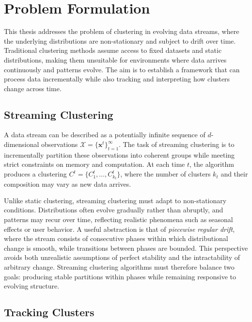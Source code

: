 \section{Problem Formulation}\label{ch:problem_formulation}

This thesis addresses the problem of clustering in evolving data streams, where
the underlying distributions are non-stationary and subject to drift over time.
Traditional clustering methods assume access to fixed datasets and static
distributions, making them unsuitable for environments where data arrives
continuously and patterns evolve. The aim is to establish a framework that can
process data incrementally while also tracking and interpreting how clusters
change across time.

\subsection{Streaming Clustering}\label{sec:prob_streaming_clustering}

A data stream can be described as a potentially infinite sequence of
$d$-dimensional observations
$\mathcal{X}=\{\mathbf{x}^t\}_{t=1}^{\infty}$. The task of streaming clustering
is to incrementally partition these observations into coherent groups while
meeting strict constraints on memory and computation. At each time $t$, the
algorithm produces a clustering $C^t=\{C_1^t,\dots,C_{k_t}^t\}$, where the
number of clusters $k_t$ and their composition may vary as new data arrives.

Unlike static clustering, streaming clustering must adapt to non-stationary
conditions. Distributions often evolve gradually rather than abruptly, and
patterns may recur over time, reflecting realistic phenomena such as seasonal
effects or user behavior. A useful abstraction is that of \emph{piecewise
regular drift}, where the stream consists of consecutive phases within which
distributional change is smooth, while transitions between phases are bounded.
This perspective avoids both unrealistic assumptions of perfect stability and
the intractability of arbitrary change. Streaming clustering algorithms must
therefore balance two goals: producing stable partitions within phases while
remaining responsive to evolving structure.

\subsection{Tracking Clusters}\label{sec:prob_tracking_clusters}

